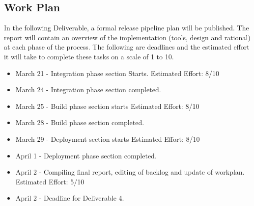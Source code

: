 \documentclass[12pt]{article}
\begin{document}
 \subsection{Work Plan}
%
In the following Deliverable, a formal release pipeline plan will be published. The report will contain an overview of the implementation (tools, design and rational) at each phase of the process. The following are deadlines and the estimated effort it will take to complete these tasks on a scale of 1 to 10.

\begin{itemize}
    \item March 21 - Integration phase section Starts. Estimated Effort: 8/10
    \item March 24 - Integration phase section completed. 
    \item March 25 - Build phase section starts Estimated Effort: 8/10
    \item March 28 - Build phase section completed.
    \item March 29 - Deployment section starts Estimated Effort: 8/10
    \item April 1 - Deployment phase section completed. 
    \item April 2 - Compiling final report, editing of backlog and update of workplan. Estimated Effort: 5/10
    \item April 2 - Deadline for Deliverable 4. 

\end{itemize}
%
\end{document}
